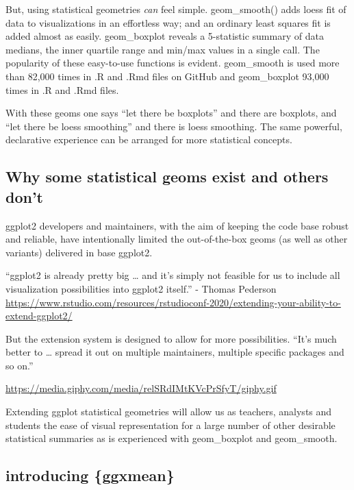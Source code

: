 \documentclass[12pt]{article}
\begin{document}
But, using statistical geometries \emph{can} feel simple. geom\_smooth()
adds loess fit of data to visualizations in an effortless way; and an
ordinary least squares fit is added almost as easily. geom\_boxplot
reveals a 5-statistic summary of data medians, the inner quartile range
and min/max values in a single call. The popularity of these easy-to-use
functions is evident. geom\_smooth is used more than 82,000 times in .R
and .Rmd files on GitHub and geom\_boxplot 93,000 times in .R and .Rmd
files.

With these geoms one says ``let there be boxplots'' and there are
boxplots, and ``let there be loess smoothing'' and there is loess
smoothing. The same powerful, declarative experience can be arranged for
more statistical concepts.

\hypertarget{why-some-statistical-geoms-exist-and-others-dont}{%
\subsection{Why some statistical geoms exist and others
don't}\label{why-some-statistical-geoms-exist-and-others-dont}}

ggplot2 developers and maintainers, with the aim of keeping the code
base robust and reliable, have intentionally limited the out-of-the-box
geoms (as well as other variants) delivered in base ggplot2.

``ggplot2 is already pretty big \ldots{} and it's simply not feasible
for us to include all visualization possibilities into ggplot2 itself.''
- Thomas Pederson
\url{https://www.rstudio.com/resources/rstudioconf-2020/extending-your-ability-to-extend-ggplot2/}

But the extension system is designed to allow for more possibilities.
``It's much better to \ldots{} spread it out on multiple maintainers,
multiple specific packages and so on.''

\url{https://media.giphy.com/media/relSRdIMtKVcPrSfyT/giphy.gif}

Extending ggplot statistical geometries will allow us as teachers,
analysts and students the ease of visual representation for a large
number of other desirable statistical summaries as is experienced with
geom\_boxplot and geom\_smooth.

\hypertarget{introducing-ggxmean}{%
\subsection{introducing \{ggxmean\}}\label{introducing-ggxmean}}
\end{document}
